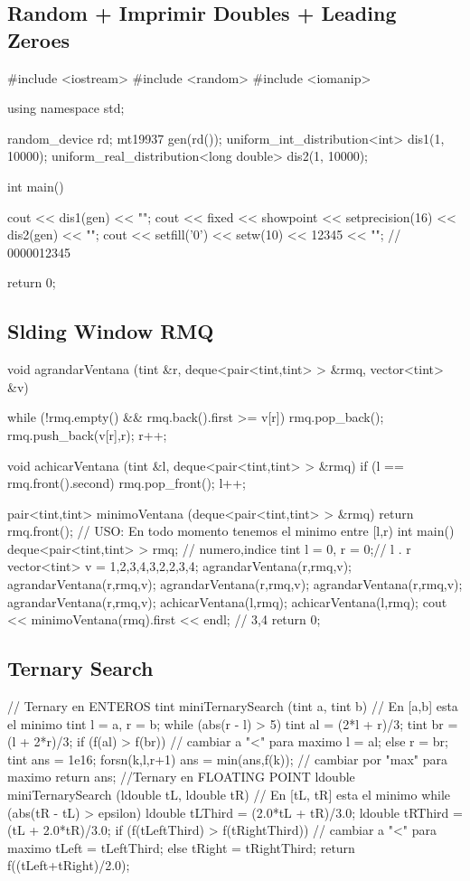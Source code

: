 \subsection{Random + Imprimir Doubles + Leading Zeroes}
\begin{code}
#include <iostream>
#include <random>
#include <iomanip>

using namespace std;

random_device rd;
mt19937 gen(rd());
uniform_int_distribution<int> dis1(1, 10000);
uniform_real_distribution<long double> dis2(1, 10000);

int main()
{
	cout <<  dis1(gen) << "\n";
	cout <<  fixed << showpoint << setprecision(16) << dis2(gen) << "\n";
	cout << setfill('0') << setw(10) << 12345 << "\n"; // 0000012345

	return 0;
}
\end{code}

\subsection{Slding Window RMQ}
\begin{code}
void agrandarVentana (tint &r, deque<pair<tint,tint> > &rmq, vector<tint> &v)
{
	while (!rmq.empty() && rmq.back().first >= v[r])
		rmq.pop_back();
	rmq.push_back({v[r],r});
	r++;
	
}

void achicarVentana (tint &l, deque<pair<tint,tint> > &rmq)
{
	if (l == rmq.front().second)
		rmq.pop_front();
	l++;
}

pair<tint,tint> minimoVentana (deque<pair<tint,tint> > &rmq)
{
	return rmq.front();
}
// USO: En todo momento tenemos el minimo entre [l,r)
int main()
{
	deque<pair<tint,tint> > rmq; // {numero,indice}
	tint l = 0, r = 0;//  l   . r
	vector<tint> v = {1,2,3,4,3,2,2,3,4};
	agrandarVentana(r,rmq,v);
	agrandarVentana(r,rmq,v);
	agrandarVentana(r,rmq,v);
	agrandarVentana(r,rmq,v);
	agrandarVentana(r,rmq,v);
	achicarVentana(l,rmq);
	achicarVentana(l,rmq);
	cout << minimoVentana(rmq).first << endl;	// {3,4}
	return 0;
}
\end{code}

\subsection{Ternary Search}
\begin{code}
// Ternary en ENTEROS
tint miniTernarySearch (tint a, tint b) // En [a,b] esta el minimo
{
	tint l = a, r = b;
	while (abs(r - l) > 5)
	{
		tint al = (2*l + r)/3;
		tint br = (l + 2*r)/3;
		if (f(al) > f(br)) // cambiar a "<" para maximo
			l = al;
		else
			r = br;			
	}
	tint ans = 1e16;
	forsn(k,l,r+1)
		ans = min(ans,f(k));  // cambiar por "max" para maximo
	return ans;
}
//Ternary en FLOATING POINT
ldouble miniTernarySearch (ldouble tL, ldouble tR) // En [tL, tR] esta el minimo
{
	while (abs(tR - tL) > epsilon)
	{
		ldouble tLThird = (2.0*tL + tR)/3.0;
		ldouble tRThird = (tL + 2.0*tR)/3.0;
		if (f(tLeftThird) > f(tRightThird)) // cambiar a "<" para maximo
			tLeft = tLeftThird;
		else
			tRight = tRightThird;			
	}
	return f((tLeft+tRight)/2.0);
}
\end{code}
